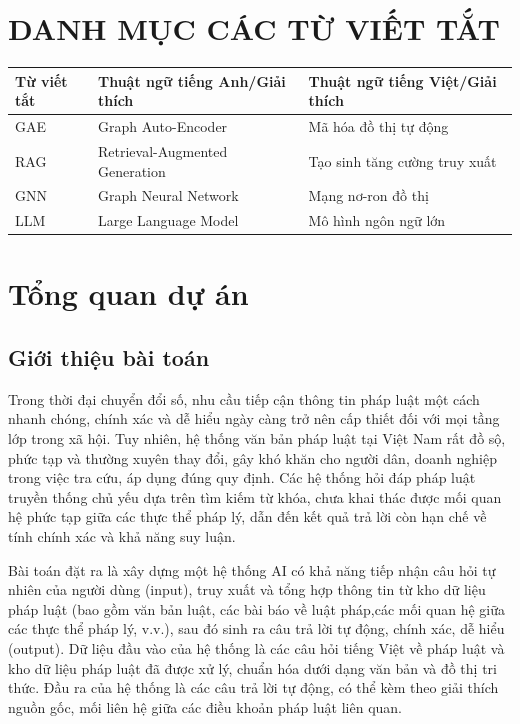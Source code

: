 \documentclass[a4paper]{article}
\begin{document}
\section*{DANH MỤC CÁC TỪ VIẾT TẮT}
\begin{table}[h!]
\centering
\begin{tabular}{|p{2cm}|p{6cm}|p{6cm}|}
\hline

\textbf{Từ viết tắt} & \textbf{Thuật ngữ tiếng Anh/Giải thích} & \textbf{Thuật ngữ tiếng Việt/Giải thích} \\ \hline
GAE & Graph Auto-Encoder & Mã hóa đồ thị tự động \\ \hline
RAG & Retrieval-Augmented Generation & Tạo sinh tăng cường truy xuất \\ \hline
GNN & Graph Neural Network & Mạng nơ-ron đồ thị \\ \hline
LLM & Large Language Model & Mô hình ngôn ngữ lớn \\ \hline
\end{tabular}
\end{table}

\clearpage


\section{Tổng quan dự án}
\subsection{Giới thiệu bài toán}
Trong thời đại chuyển đổi số, nhu cầu tiếp cận thông tin pháp luật một cách nhanh chóng, chính xác và dễ hiểu ngày càng trở nên cấp thiết đối với mọi tầng lớp trong xã hội. Tuy nhiên, hệ thống văn bản pháp luật tại Việt Nam rất đồ sộ, phức tạp và thường xuyên thay đổi, gây khó khăn cho người dân, doanh nghiệp trong việc tra cứu, áp dụng đúng quy định. Các hệ thống hỏi đáp pháp luật truyền thống chủ yếu dựa trên tìm kiếm từ khóa, chưa khai thác được mối quan hệ phức tạp giữa các thực thể pháp lý, dẫn đến kết quả trả lời còn hạn chế về tính chính xác và khả năng suy luận.

Bài toán đặt ra là xây dựng một hệ thống AI có khả năng tiếp nhận câu hỏi tự nhiên của người dùng (input), truy xuất và tổng hợp thông tin từ kho dữ liệu pháp luật (bao gồm văn bản luật, các bài báo về luật pháp,các mối quan hệ giữa các thực thể pháp lý, v.v.), sau đó sinh ra câu trả lời tự động, chính xác, dễ hiểu (output). Dữ liệu đầu vào của hệ thống là các câu hỏi tiếng Việt về pháp luật và kho dữ liệu pháp luật đã được xử lý, chuẩn hóa dưới dạng văn bản và đồ thị tri thức. Đầu ra của hệ thống là các câu trả lời tự động, có thể kèm theo giải thích nguồn gốc, mối liên hệ giữa các điều khoản pháp luật liên quan.
\end{document}
